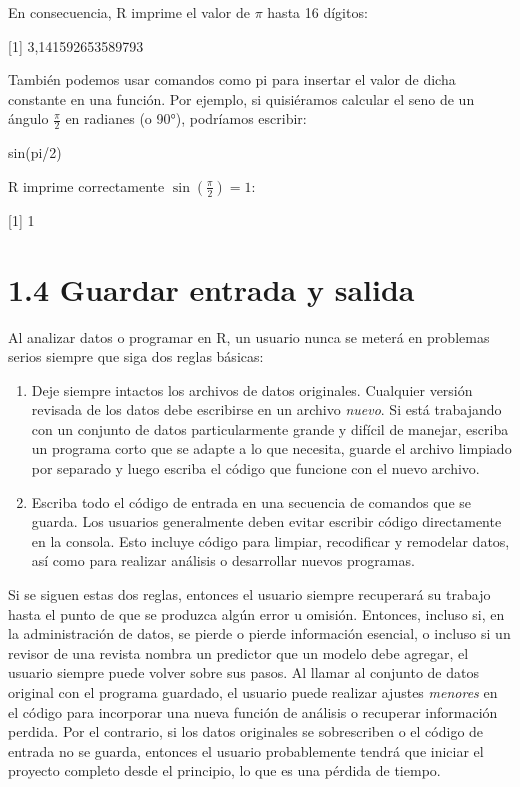 \documentclass[
]{book}
\newenvironment{Shaded}{\begin{snugshade}}{\end{snugshade}}
\newcommand{\DecValTok}[1]{\textcolor[rgb]{0.00,0.00,0.81}{#1}}
\newcommand{\FunctionTok}[1]{\textcolor[rgb]{0.00,0.00,0.00}{#1}}
\newcommand{\NormalTok}[1]{#1}
\newcommand{\SpecialCharTok}[1]{\textcolor[rgb]{0.00,0.00,0.00}{#1}}
\providecommand{\tightlist}{%
  \setlength{\itemsep}{0pt}\setlength{\parskip}{0pt}}
\begin{document}
En consecuencia, R imprime el valor de \(\pi\) hasta 16 dígitos:

{[}1{]} 3,141592653589793

También podemos usar comandos como pi para insertar el valor de dicha constante en una función. Por ejemplo, si quisiéramos calcular el seno de un ángulo \(\frac{\pi}{2}\) en radianes (o 90°), podríamos escribir:

\begin{Shaded}
\begin{Highlighting}[]
\FunctionTok{sin}\NormalTok{(pi}\SpecialCharTok{/}\DecValTok{2}\NormalTok{)}
\end{Highlighting}
\end{Shaded}

R imprime correctamente \(\sin \left(\frac{\pi}{2}\right)=1\):

{[}1{]} 1

\hypertarget{guardar-entrada-y-salida}{%
\section*{\texorpdfstring{\textbf{1.4 Guardar entrada y salida}}{1.4 Guardar entrada y salida}}\label{guardar-entrada-y-salida}}

Al analizar datos o programar en R, un usuario nunca se meterá en problemas serios siempre que siga dos reglas básicas:

\begin{enumerate}
\def\labelenumi{\arabic{enumi}.}
\tightlist
\item
  Deje siempre intactos los archivos de datos originales. Cualquier versión revisada de los datos debe escribirse en un archivo \emph{nuevo}. Si está trabajando con un conjunto de datos particularmente grande y difícil de manejar, escriba un programa corto que se adapte a lo que necesita, guarde el archivo limpiado por separado y luego escriba el código que funcione con el nuevo archivo.
\item
  Escriba todo el código de entrada en una secuencia de comandos que se guarda. Los usuarios generalmente deben evitar escribir código directamente en la consola. Esto incluye código para limpiar, recodificar y remodelar datos, así como para realizar análisis o desarrollar nuevos programas.
\end{enumerate}

Si se siguen estas dos reglas, entonces el usuario siempre recuperará su trabajo hasta el punto de que se produzca algún error u omisión. Entonces, incluso si, en la administración de datos, se pierde o pierde información esencial, o incluso si un revisor de una revista nombra un predictor que un modelo debe agregar, el usuario siempre puede volver sobre sus pasos. Al llamar al conjunto de datos original con el programa guardado, el usuario puede realizar ajustes \emph{menores} en el código para incorporar una nueva función de análisis o recuperar información perdida. Por el contrario, si los datos originales se sobrescriben o el código de entrada no se guarda, entonces el usuario probablemente tendrá que iniciar el proyecto completo desde el principio, lo que es una pérdida de tiempo.
\end{document}
